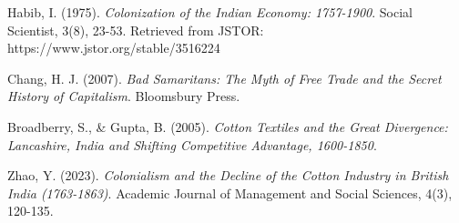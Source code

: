 \documentclass[9pt,twocolumn,twoside]{opticajnl}
\begin{document}
\begin{thebibliography}{9}
Habib, I. (1975). \textit{Colonization of the Indian Economy: 1757-1900}. Social Scientist, 3(8), 23-53. Retrieved from JSTOR: https://www.jstor.org/stable/3516224

Chang, H. J. (2007). \textit{Bad Samaritans: The Myth of Free Trade and the Secret History of Capitalism}. Bloomsbury Press.

Broadberry, S., \& Gupta, B. (2005). \textit{Cotton Textiles and the Great Divergence: Lancashire, India and Shifting Competitive Advantage, 1600-1850}. 

Zhao, Y. (2023). \textit{Colonialism and the Decline of the Cotton Industry in British India (1763-1863)}. Academic Journal of Management and Social Sciences, 4(3), 120-135.
\end{thebibliography}
\end{document}
